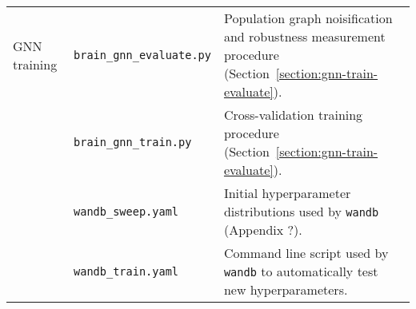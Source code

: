 \begin{center}
\begin{longtable}[]{p{}p{}p{}}
    GNN training
            & \texttt{brain\_gnn\_evaluate.py} & Population graph noisification and robustness measurement procedure (Section~\ref{section:gnn-train-evaluate}). \\
            & \texttt{brain\_gnn\_train.py} & Cross-validation training procedure (Section~\ref{section:gnn-train-evaluate}). \\
            & \texttt{wandb\_sweep.yaml} & Initial hyperparameter distributions used by \texttt{wandb} (Appendix ?). \\
            & \texttt{wandb\_train.yaml} & Command line script used by \texttt{wandb} to automatically test new hyperparameters. \\
\end{longtable}
\end{center}